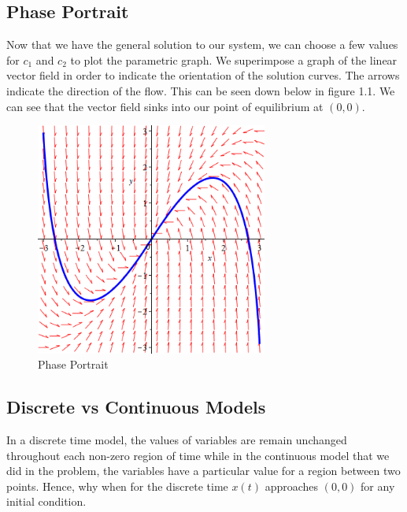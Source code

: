 \documentclass[12pt]{report}
\begin{document}
\subsection{Phase Portrait}
\begin{flushleft} 
Now that we have the general solution to our system, we can choose a few values for $c_{1}$ and $c_{2}$ to plot the parametric graph. We superimpose a graph of the linear vector field in order to indicate the orientation of the solution curves. The arrows indicate the direction of the flow. This can be seen down below in figure 1.1. We can see that the vector field sinks into our point of equilibrium at $(0,0)$.
\end{flushleft} 
\begin{figure}[h]
    \centering
    \includegraphics[width=3in]{vectorgraph.png}
    \caption{Phase Portrait}
    \label{fig:vector}
\end{figure}
\subsection{Discrete vs Continuous Models} 
\begin{flushleft}
In a discrete time model, the values of variables are remain unchanged throughout each non-zero region of time while in the continuous model that we did in the problem, the variables have a  particular value for a region between two points. Hence, why when for the discrete time $x(t)$ approaches $(0,0)$ for any initial condition. 
\end{flushleft} 
\end{document}
